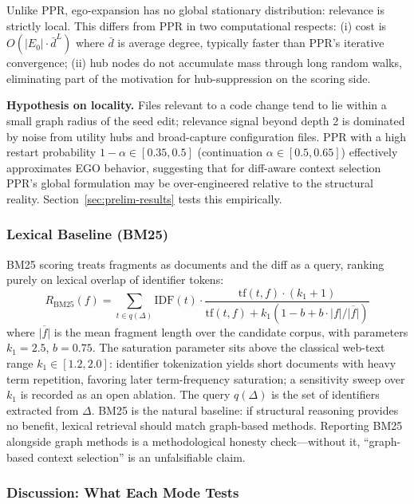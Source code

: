\documentclass[11pt, a4paper]{article}
\begin{document}
Unlike PPR, ego-expansion has no global stationary distribution: relevance is strictly local. This differs from PPR in two computational respects: (i) cost is $O(|E_0| \cdot \bar{d}^L)$ where $\bar{d}$ is average degree, typically faster than PPR's iterative convergence; (ii) hub nodes do not accumulate mass through long random walks, eliminating part of the motivation for hub-suppression on the scoring side.

\textbf{Hypothesis on locality.} Files relevant to a code change tend to lie within a small graph radius of the seed edit; relevance signal beyond depth 2 is dominated by noise from utility hubs and broad-capture configuration files. PPR with a high restart probability $1-\alpha \in [0.35, 0.5]$ (continuation $\alpha \in [0.5, 0.65]$) effectively approximates EGO behavior, suggesting that for diff-aware context selection PPR's global formulation may be over-engineered relative to the structural reality. Section~\ref{sec:prelim-results} tests this empirically.

\subsubsection{Lexical Baseline (BM25)}
\label{sec:bm25}

BM25 scoring treats fragments as documents and the diff as a query, ranking purely on lexical overlap of identifier tokens:
\begin{equation}
R_{\mathrm{BM25}}(f) = \sum_{t \in q(\Delta)} \mathrm{IDF}(t) \cdot \frac{\mathrm{tf}(t, f) \cdot (k_1 + 1)}{\mathrm{tf}(t, f) + k_1 (1 - b + b \cdot |f| / \overline{|f|})}
\end{equation}
where $\overline{|f|}$ is the mean fragment length over the candidate corpus, with parameters $k_1 = 2.5$, $b = 0.75$. The saturation parameter sits above the classical web-text range $k_1 \in [1.2, 2.0]$: identifier tokenization yields short documents with heavy term repetition, favoring later term-frequency saturation; a sensitivity sweep over $k_1$ is recorded as an open ablation. The query $q(\Delta)$ is the set of identifiers extracted from $\Delta$. BM25 is the natural baseline: if structural reasoning provides no benefit, lexical retrieval should match graph-based methods. Reporting BM25 alongside graph methods is a methodological honesty check---without it, ``graph-based context selection'' is an unfalsifiable claim.

\subsubsection{Discussion: What Each Mode Tests}
\label{sec:scoring-discussion}
\end{document}
